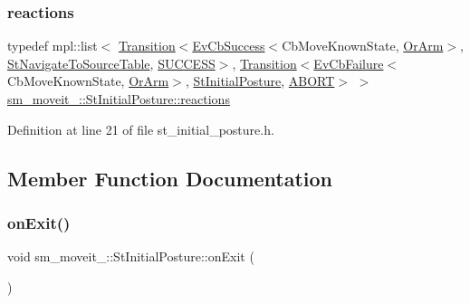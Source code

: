 \subsubsection{\texorpdfstring{reactions}{reactions}}
{\footnotesize\ttfamily typedef mpl\+::list$<$ \hyperlink{classsmacc_1_1Transition}{Transition}$<$\hyperlink{structsmacc_1_1EvCbSuccess}{Ev\+Cb\+Success}$<$Cb\+Move\+Known\+State, \hyperlink{classsm__moveit__4_1_1OrArm}{Or\+Arm}$>$, \hyperlink{structsm__moveit__4_1_1StNavigateToSourceTable}{St\+Navigate\+To\+Source\+Table}, \hyperlink{structsmacc_1_1default__transition__tags_1_1SUCCESS}{S\+U\+C\+C\+E\+SS}$>$, \hyperlink{classsmacc_1_1Transition}{Transition}$<$\hyperlink{structsmacc_1_1EvCbFailure}{Ev\+Cb\+Failure}$<$Cb\+Move\+Known\+State, \hyperlink{classsm__moveit__4_1_1OrArm}{Or\+Arm}$>$, \hyperlink{structsm__moveit__4_1_1StInitialPosture}{St\+Initial\+Posture}, \hyperlink{structsmacc_1_1default__transition__tags_1_1ABORT}{A\+B\+O\+RT}$>$ $>$ \hyperlink{structsm__moveit__4_1_1StInitialPosture_a148911f1eb562fd614640abc29ba1d07}{sm\+\_\+moveit\+\_\+::\+St\+Initial\+Posture\+::reactions}}



Definition at line 21 of file st\+\_\+initial\+\_\+posture.\+h.



\subsection{Member Function Documentation}
\mbox{\label{structsm__moveit__4_1_1StInitialPosture_a91c21def08d344903c12e96c36a2fd23}} 
\subsubsection{\texorpdfstring{on\+Exit()}{onExit()}\hspace{0.1cm}{\footnotesize\ttfamily [1/3]}}
{\footnotesize\ttfamily void sm\+\_\+moveit\+\_\+::\+St\+Initial\+Posture\+::on\+Exit (\begin{DoxyParamCaption}\item[{\hyperlink{structsmacc_1_1default__transition__tags_1_1SUCCESS}{S\+U\+C\+C\+E\+SS}}]{ }\end{DoxyParamCaption})\hspace{0.3cm}{\ttfamily [inline]}}



